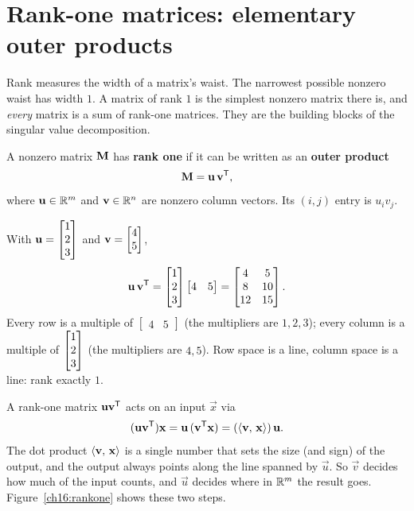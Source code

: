 \section{Rank-one matrices: elementary outer products}

Rank measures the width of a matrix's waist. The narrowest
possible nonzero waist has width $1$. A matrix of rank $1$ is the simplest
nonzero matrix there is, and \emph{every} matrix is a sum of
rank-one matrices. They are the building blocks of the singular value
decomposition.

\begin{definition}\label{ch16:rank-one-def}
A nonzero matrix $\mathbf{M}$ has \textbf{rank one} if it can be written as an
\textbf{outer product}
\[
  \mathbf{M} = \mathbf{u}\,\mathbf{v}^{\mathsf{T}},
\]
where $\mathbf{u}\in\mathbb{R}^m$ and $\mathbf{v}\in\mathbb{R}^n$ are nonzero column vectors. Its
$(i,j)$ entry is $u_i v_j$.
\end{definition}

\begin{example}\label{ch16:outer}
With $\mathbf{u}=\begin{bmatrix}1\\2\\3\end{bmatrix}$ and $\mathbf{v}=\begin{bmatrix}4\\5\end{bmatrix}$,
\[
  \mathbf{u}\,\mathbf{v}^{\mathsf{T}}
  = \begin{bmatrix}1\\2\\3\end{bmatrix}\begin{bmatrix}4 & 5\end{bmatrix}
  = \begin{bmatrix} 4 & 5 \\ 8 & 10 \\ 12 & 15 \end{bmatrix}.
\]
Every row is a multiple of $\begin{bmatrix}4 & 5\end{bmatrix}$ (the multipliers
are $1,2,3$); every column is a multiple of $\begin{bmatrix}1\\2\\3\end{bmatrix}$ (the multipliers
are $4,5$). Row space is a line, column space is a line: rank exactly $1$.
\end{example}

\begin{intuitionbox}
A rank-one matrix $\mathbf{u}\mathbf{v}^{\mathsf{T}}$ acts on an input $\vec{x}$ via
\[
  (\mathbf{u}\mathbf{v}^{\mathsf{T}})\mathbf{x} = \mathbf{u}\,(\mathbf{v}^{\mathsf{T}}\mathbf{x})
  = (\langle \mathbf{v},\, \mathbf{x} \rangle)\,\mathbf{u}.
\]
The dot product $\langle \mathbf{v},\, \mathbf{x} \rangle$ is a single number that sets the size
(and sign) of the output, and the output always points along the line spanned by
$\vec{u}$. So $\vec{v}$ decides how much of the input counts, and $\vec{u}$
decides where in $\mathbb{R}^m$ the result goes. Figure~\ref{ch16:rankone} shows these
two steps.
\end{intuitionbox}

